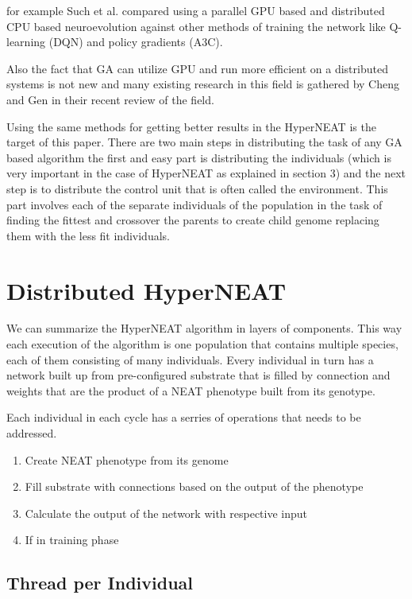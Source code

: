 \documentclass[twocolumn]{article}
\begin{document}
for example Such et al. compared using a parallel GPU based and distributed CPU based neuroevolution against other methods of training the network like Q-learning (DQN) and policy gradients (A3C). \cite{GA-GPU-Comparison}

Also the fact that GA can utilize GPU and run more efficient on a distributed systems is not new and many existing research in this field is gathered by Cheng and Gen in their recent review of the field. \cite{GA-GPU-Review}

Using the same methods for getting better results in the HyperNEAT is the target of this paper. There are two main steps in distributing the task of any GA based algorithm the first and easy part is distributing the individuals (which is very important in the case of HyperNEAT as explained in section 3) and the next step is to distribute the control unit that is often called the environment. This part involves each of the separate individuals of the population in the task of finding the fittest and crossover the parents to create child genome replacing them with the less fit individuals.


\section{Distributed HyperNEAT}
We can summarize the HyperNEAT algorithm in layers of components. This way each execution of the algorithm is one population that contains multiple species, each of them consisting of many individuals. Every individual in turn has a network built up from pre-configured substrate that is filled by connection and weights that are the product of a NEAT phenotype built from its genotype.

Each individual in each cycle has a serries of operations that needs to be addressed.

\begin{enumerate}
    \item Create NEAT phenotype from its genome
    \item Fill substrate with connections based on the output of the phenotype
    \item Calculate the output of the network with respective input
    \item If in training phase 
\end{enumerate}

\subsection{Thread per Individual}
\end{document}
